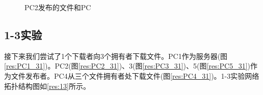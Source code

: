 \documentclass[thesis]{thesis}
\begin{document}
	\begin{figure}[H]
		\centering
		\caption{PC2发布的文件和PC}
		\label{res:file}		
	\end{figure}

	\subsection{1-3实验}
	接下来我们尝试了1个下载者向3个拥有者下载文件。PC1作为服务器(图\ref{res:PC1_31})。PC2(图\ref{res:PC2_31})、3(图\ref{res:PC3_31})、5(图\ref{res:PC5_31})作为文件发布者。PC4从三个文件拥有者处下载文件(图\ref{res:PC4_31})。1-3实验网络拓扑结构图如\ref{res:13}所示。
\end{document}
